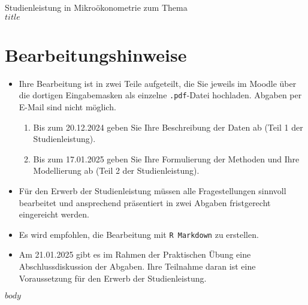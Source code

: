 \documentclass{article}
\begin{document}
\begin{center}
  {\large Studienleistung in Mikroökonometrie zum Thema} \\ \vspace{1em}
  {\LARGE $title$}
\end{center}

\section{Bearbeitungshinweise}

\begin{itemize}
  \item Ihre Bearbeitung ist in zwei Teile aufgeteilt, die Sie jeweils im Moodle über die dortigen Eingabemasken als einzelne \texttt{.pdf}-Datei hochladen. Abgaben per E-Mail sind nicht möglich.
  \begin{enumerate}
    \item Bis zum 20.12.2024 geben Sie Ihre Beschreibung der Daten ab (Teil 1 der Studienleistung).
    \item Bis zum 17.01.2025 geben Sie Ihre Formulierung der Methoden und Ihre Modellierung ab (Teil 2 der Studienleistung).
  \end{enumerate}
  \item Für den Erwerb der Studienleistung müssen alle Fragestellungen sinnvoll bearbeitet und ansprechend präsentiert in zwei Abgaben fristgerecht eingereicht werden.
  \item Es wird empfohlen, die Bearbeitung mit \texttt{R Markdown} zu erstellen. 
  \item Am 21.01.2025 gibt es im Rahmen der Praktischen Übung eine Abschlussdiskussion der Abgaben. Ihre Teilnahme daran ist eine Voraussetzung für den Erwerb der Studienleistung.
\end{itemize}

$body$
\end{document}
